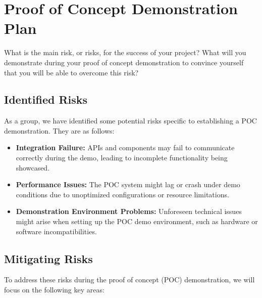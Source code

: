 \documentclass{article}
\begin{document}
\section{Proof of Concept Demonstration Plan}

What is the main risk, or risks, for the success of your project?  What will you
demonstrate during your proof of concept demonstration to convince yourself that
you will be able to overcome this risk?

\subsection*{Identified Risks}

As a group, we have identified some potential risks specific to establishing a POC demonstration. They are as follows:
\begin{itemize}
    \item \textbf{Integration Failure:} APIs and components may fail to communicate correctly during the demo, leading to incomplete functionality being showcased.
    \item \textbf{Performance Issues:} The POC system might lag or crash under demo conditions due to unoptimized configurations or resource limitations.
    \item \textbf{Demonstration Environment Problems:} Unforeseen technical issues might arise when setting up the POC demo environment, such as hardware or software incompatibilities.
\end{itemize}

\subsection*{Mitigating Risks}
To address these risks during the proof of concept (POC) demonstration, we will focus on the following key areas:
\end{document}
